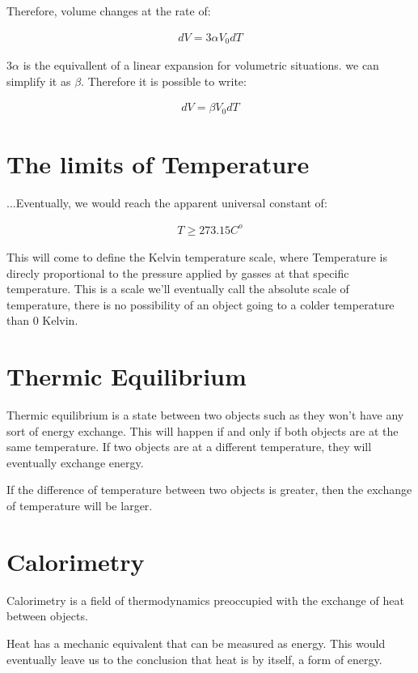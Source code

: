 \documentclass[11pt,fleqn]{book} %
\begin{document}
Therefore, volume changes at the rate of:

\begin{gather}
    dV = 3\alpha V_0 dT
\end{gather}

$3\alpha$ is the equivallent of a linear expansion for volumetric situations.
we can simplify it as $\beta$. Therefore it is possible to write:

\begin{gather}
    dV = \beta V_0 dT
\end{gather}

\section{The limits of Temperature}

...Eventually, we would reach the apparent universal constant of:

\begin{gather}
    T \geq 273.15 C^o
\end{gather}

This will come to define the Kelvin temperature scale, where Temperature is direcly proportional
to the pressure applied by gasses at that specific temperature. This is a scale we'll eventually 
call the absolute scale of temperature, there is no possibility of an object going to a colder 
temperature than 0 Kelvin.

\section{Thermic Equilibrium}

Thermic equilibrium is a state between two objects such as they won't have any sort of energy exchange.
This will happen if and only if both objects are at the same temperature. If two objects are at a different temperature, 
they will eventually exchange energy.

If the difference of temperature between two objects is greater, then the exchange of temperature will be larger. 

\section{Calorimetry}

Calorimetry is a field of thermodynamics preoccupied with the exchange
of heat between objects. 

Heat has a mechanic equivalent that can be measured as energy. This would eventually leave us to the conclusion
that heat is by itself, a form of energy. 
\end{document}
